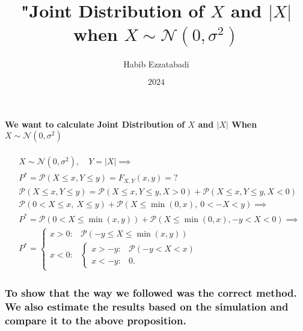 \documentclass[12pt]{article}
\author{Habib Ezzatabadi}
\date{$2024$}
\title{"Joint Distribution of $X$ and $|X|$ when $X \sim \mathcal{N}(0, \sigma^2)$}
\begin{document}
    
    \maketitle
    
    

    
    \paragraph{\texorpdfstring{We want to calculate Joint Distribution of
\(X\) and \(|X|\) When
\(X \sim \mathcal{N}(0, \sigma^2)\)}{We want to calculate Joint Distribution of X and \textbar X\textbar{} When X \textbackslash sim \textbackslash mathcal\{N\}(0, \textbackslash sigma\^{}2)}}\label{we-want-to-calculate-joint-distribution-of-x-and-x-when-x-sim-mathcaln0-sigma2}

    \[
\begin{aligned}
& X\sim\mathcal{N}(0, \sigma^2), \quad Y = \vert X \vert \implies \\
& P^* = \mathcal{P}(X \leq x, Y \leq y) = F_{X, Y}(x, y) = ? \\
& \mathcal{P}(X \leq x, Y \leq y) = \mathcal{P}(X \leq x, Y \leq y, X > 0) + \mathcal{P}(X \leq x, Y \leq y, X < 0)\\
& \mathcal{P}(0 < X \leq x, ~ X \leq y) + \mathcal{P}(X \leq \min(0, x), ~0 < -X < y) \implies \\
& P^* = \mathcal{P}(0 < X \leq \min(x, y)) + \mathcal{P}(X \leq \min(0, x), -y < X < 0) \implies \\
& P^* = \begin{cases}
x > 0: & \mathcal{P}(-y \leq X \leq \min(x, y)) \\
x < 0: & \begin{cases} 
x > -y: & \mathcal{P}(-y < X < x) \\
x < -y: & 0.
\end{cases}
\end{cases}
\end{aligned}
\]

    \subsubsection{To show that the way we followed was the correct method.
We also estimate the results based on the simulation and compare it to
the above
proposition.}\label{to-show-that-the-way-we-followed-was-the-correct-method.-we-also-estimate-the-results-based-on-the-simulation-and-compare-it-to-the-above-proposition.}
\end{document}
